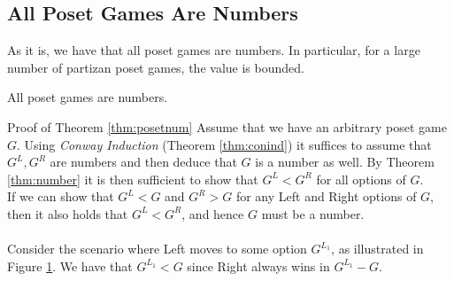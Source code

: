 \subsection{All Poset Games Are Numbers}
As it is, we have that all poset games are numbers. In particular, for a large number of partizan poset games, the value is bounded.%
\begin{thm}
\label{thm:posetnum}
All poset games are numbers.
\end{thm}
\begin{proof2}{Proof of Theorem \ref{thm:posetnum}}
Assume that we have an arbitrary poset game $G$. Using \emph{Conway Induction} (Theorem \ref{thm:conind}) it suffices to assume that $G^L,G^R$ are numbers and then deduce that $G$ is a number as well. By Theorem \ref{thm:number} it is then sufficient to show that $G^L<G^R$ for all options of $G$.
\\
If we can show that $G^L<G$ and $G^R>G$ for any Left and Right options of $G$, then it also holds that $G^L<G^R$, and hence $G$ must be a number.
\\\\
Consider the scenario where Left moves to some option $G^{L_1}$, as illustrated in Figure \ref{fig:posetnum1}. We have that $G^{L_1}<G$ since Right always wins in $G^{L_1}-G$.
\\
\begin{figure}[H]
\centering
\begin{subfigure}{0.45\textwidth}
\end{subfigure}
\begin{subfigure}{0.45\textwidth}
\end{subfigure}
\label{fig:posetnum1}
\end{figure} 


\end{proof2}
